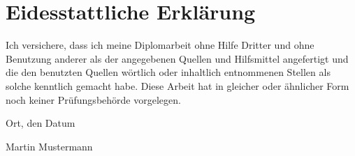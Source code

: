 \chapter*{Eidesstattliche Erkl\"{a}rung}
\thispagestyle{empty}
Ich versichere, dass ich meine Diplomarbeit ohne Hilfe Dritter und ohne Benutzung
anderer als der angegebenen Quellen und Hilfsmittel angefertigt und die den benutzten
Quellen w\"{o}rtlich oder inhaltlich entnommenen Stellen als solche kenntlich gemacht habe.
Diese Arbeit hat in gleicher oder \"{a}hnlicher Form noch keiner Pr\"{u}fungsbeh\"{o}rde
vorgelegen.
\bigskip

\raggedright{Ort, den Datum} \bigskip \bigskip \bigskip

Martin Mustermann